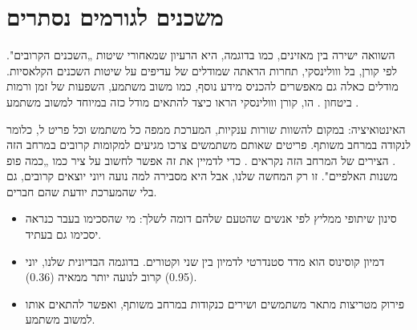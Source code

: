 \section{משכנים לגורמים נסתרים}

השוואה ישירה בין מאזינים, כמו בדוגמה, היא הרעיון שמאחורי שיטות „השכנים הקרובים". לפי קורן, בל ווולינסקי, תחרות  הראתה שמודלים של  עדיפים על שיטות השכנים הקלאסיות. מודלים כאלה גם מאפשרים להכניס מידע נוסף, כמו משוב משתמע, השפעות של זמן ורמות ביטחון \cite{koren2009matrix}. הו, קורן ווולינסקי הראו כיצד להתאים מודל כזה במיוחד למשוב משתמע \cite{hu2008collaborative}.

האינטואיציה: במקום להשוות שורות ענקיות, המערכת ממפה כל משתמש וכל פריט ל, כלומר לנקודה במרחב משותף. פריטים שאותם משתמשים צרכו מגיעים למקומות קרובים במרחב הזה \cite{google2026candidate}. הצירים של המרחב הזה נקראים . כדי לדמיין את זה אפשר לחשוב על ציר כמו „כמה פופ משנות האלפיים". זו רק המחשה שלנו, אבל היא מסבירה למה נועה ויוני יוצאים קרובים, גם בלי שהמערכת יודעת שהם חברים.

\begin{inshort}
\begin{itemize}
  \item סינון שיתופי ממליץ לפי אנשים שהטעם שלהם דומה לשלך: מי שהסכימו בעבר כנראה יסכימו גם בעתיד.
  \item דמיון קוסינוס הוא מדד סטנדרטי לדמיון בין שני וקטורים. בדוגמה הבדיונית שלנו, יוני (0.95) קרוב לנועה יותר ממאיה (0.36).
  \item פירוק מטריצות מתאר משתמשים ושירים כנקודות במרחב משותף, ואפשר להתאים אותו למשוב משתמע.
\end{itemize}
\end{inshort}
